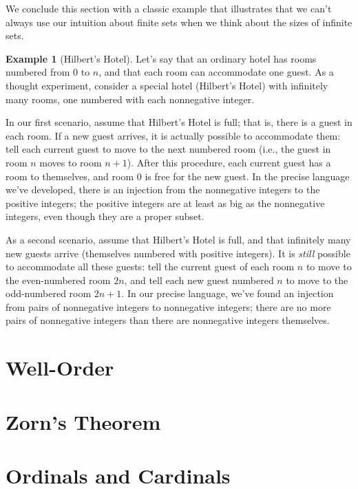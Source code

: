 \documentclass[letterpaper]{article}
\theoremstyle{definition}
\newtheorem{example}[theorem]{Example}
\begin{document}
We conclude this section with a classic example that illustrates that
we can't always use our intuition about finite sets when we think
about the sizes of infinite sets.
\begin{example}[Hilbert's Hotel]
  Let's say that an ordinary hotel has rooms numbered from 0 to \(n\),
  and that each room can accommodate one guest.  As a thought
  experiment, consider a special hotel (Hilbert's Hotel) with
  infinitely many rooms, one numbered with each nonnegative integer.

  In our first scenario, assume that Hilbert's Hotel is full; that is,
  there is a guest in each room.  If a new guest arrives, it is
  actually possible to accommodate them: tell each current guest to
  move to the next numbered room (i.e., the guest in room \(n\) moves
  to room \(n+1\)).  After this procedure, each current guest has a
  room to themselves, and room 0 is free for the new guest.  In the
  precise language we've developed, there is an injection from the
  nonnegative integers to the positive integers; the positive integers
  are at least as big as the nonnegative integers, even though they
  are a proper subset.

  As a second scenario, assume that Hilbert's Hotel is full, and that
  infinitely many new guests arrive (themselves numbered with positive
  integers).  It is \emph{still} possible to accommodate all these
  guests: tell the current guest of each room \(n\) to move to the
  even-numbered room \(2n\), and tell each new guest numbered \(n\) to
  move to the odd-numbered room \(2n+1\).  In our precise language,
  we've found an injection from pairs of nonnegative integers to
  nonnegative integers; there are no more pairs of nonnegative
  integers than there are nonnegative integers themselves.
\end{example}

\section{Well-Order}

\section{Zorn's Theorem}

\section{Ordinals and Cardinals}
\end{document}

